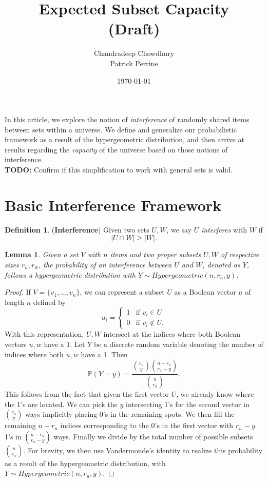 \documentclass[10pt]{extarticle}
\title{\textbf{Expected Subset Capacity \\ (Draft)}}
\author{Chandradeep Chowdhury \\ Patrick Perrine}
\date{\today}
\newtheorem{lemma}[theorem]{Lemma}
\theoremstyle{definition}
\newtheorem{definition}[theorem]{Definition}
\begin{document}
 \maketitle
 
In this article, we explore the notion of \textit{interference} of randomly shared items between sets within a universe. We define and generalize our probabilistic framework as a result of the hypergeometric distribution, and then arrive at results regarding the \textit{capacity} of the universe based on those notions of interference. \\

\textbf{TODO:} Confirm if this simplification to work with general sets is valid.

\section{Basic Interference Framework}

\begin{definition}
    (\textbf{Interference}) Given two sets $U, W$, we say $U$ \textit{interferes} with $W$ if 
    \begin{equation}
        |U \cap W| \ge |W|.
    \end{equation}
\end{definition}

\begin{lemma}
	Given a set $V$ with $n$ items and two proper subsets $U,W$ of respective sizes $r_u,r_w$, the probability of an interference between $U$ and $W$, denoted as $Y$, follows a hypergeometric distribution with $Y \sim Hypergeometric(n, r_u, y)$.
\end{lemma}
\begin{proof}
	If $V = \{v_1,...,v_n\}$, we can represent a subset $U$ as a Boolean vector $u$ of length $n$ defined by
    $$
    u_i = \begin{cases}
        1 & \text{if } v_i \in U \\
        0 & \text{if } v_i \notin U.
    \end{cases}
    $$
    With this representation, $U,W$ intersect at the indices where both Boolean vectors $u, w$ have a $1$. Let $Y$ be a discrete random variable denoting the number of indices where both $u, w$ have a 1. Then 
    \begin{equation}
        \mathbb{P}(Y=y) = \frac{\binom{r_u}{y} \binom{n-r_u}{r_w-y}}{\binom{n}{r_w}}.
    \end{equation}
    This follows from the fact that given the first vector $U$, we already know where the 1's are located. We can pick the $y$ intersecting 1's for the second vector in $\binom{r_u}{y}$ ways implicitly placing 0's in the remaining spots. We then fill the remaining $n-r_u$ indices corresponding to the 0's in the first vector with $r_w-y$ 1's in $\binom{n-r_u}{r_w-y}$ ways. Finally we divide by the total number of possible subsets $\binom{n}{r_w}$. For brevity, we then use Vandermonde's identity to realize this probability as a result of the hypergeometric distribution, with $Y \sim Hypergeometric(n, r_u, y)$.
\end{proof}
\end{document}
